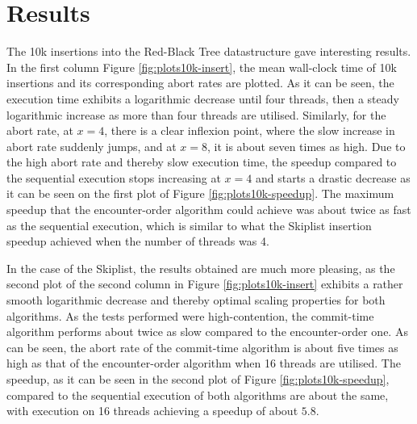 \section{Results}
\label{section:res}

The 10k insertions into the Red-Black Tree datastructure gave interesting results. In the first column Figure \ref{fig:plots10k-insert}, the mean wall-clock time of 10k insertions and its corresponding abort rates are plotted. As it can be seen, the execution time exhibits a logarithmic decrease until four threads, then a steady logarithmic increase as more than four threads are utilised. Similarly, for the abort rate, at $x = 4$, there is a clear inflexion point, where the slow increase in abort rate suddenly jumps, and at $x = 8$, it is about seven times as high. Due to the high abort rate and thereby slow execution time, the speedup compared to the sequential execution stops increasing at $x = 4$ and starts a drastic decrease as it can be seen on the first plot of Figure \ref{fig:plots10k-speedup}. The maximum speedup that the encounter-order algorithm could achieve was about twice as fast as the sequential execution, which is similar to what the Skiplist insertion speedup achieved when the number of threads was 4.

In the case of the Skiplist, the results obtained are much more pleasing, as the second plot of the second column in Figure \ref{fig:plots10k-insert} exhibits a rather smooth logarithmic decrease and thereby optimal scaling properties for both algorithms. As the tests performed were high-contention, the commit-time algorithm performs about twice as slow compared to the encounter-order one. As can be seen, the abort rate of the commit-time algorithm is about five times as high as that of the encounter-order algorithm when 16 threads are utilised. The speedup, as it can be seen in the second plot of Figure \ref{fig:plots10k-speedup}, compared to the sequential execution of both algorithms are about the same, with execution on 16 threads achieving a speedup of about $5.8$.

